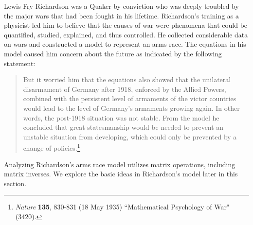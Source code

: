  \label{chap:matrix_inverse}

\vspace*{-17 pt}

\vspace*{13 pt}


\label{sec:appl_arms_race}

Lewis Fry Richardson was a Quaker by conviction who was deeply troubled by the major wars that had been fought in his lifetime. Richardson's training as a physicist led him to believe that the causes of war were phenomena that could be quantified, studied, explained, and thus controlled. He collected considerable data on wars and constructed a model to represent an arms race. The equations in his model caused him concern about the future as indicated by the following statement:  
\begin{quote} But it worried him that the equations also showed that the unilateral disarmament of Germany after 1918, enforced by the Allied Powers, combined with the persistent level of armaments of the victor countries would lead to the level of Germany's armaments growing again. In other words, the post-1918 situation was not stable. From the model he concluded that great statesmanship would be needed to prevent an unstable situation from developing, which could only be prevented by a change of policies.\footnote{\emph{Nature} \textbf{135}, 830-831 (18 May 1935) ``Mathematical Psychology of War" (3420).}
\end{quote}
Analyzing Richardson's arms race model utilizes matrix operations, including matrix inverses. We explore the basic ideas in Richardson's model later in this section. 


